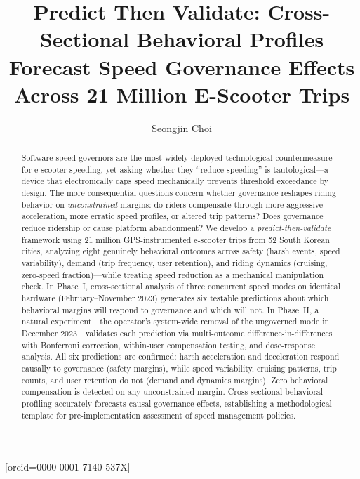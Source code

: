\documentclass[a4paper,fleqn]{cas-sc}
\begin{document}
\let\WriteBookmarks\relax
\def\floatpagepagefraction{1}
\def\textpagefraction{.001}

\title[mode=title]{Predict Then Validate: Cross-Sectional Behavioral Profiles Forecast Speed Governance Effects Across 21 Million E-Scooter Trips}

\author[1]{Seongjin Choi}[orcid=0000-0001-7140-537X]
\cormark[1]

\address[1]{Department of Civil, Environmental, and Geo- Engineering, University of Minnesota, 500 Pillsbury Dr.\ SE, Minneapolis, MN 55455, USA}


\begin{abstract}
Software speed governors are the most widely deployed technological countermeasure for e-scooter speeding, yet asking whether they ``reduce speeding'' is tautological---a device that electronically caps speed mechanically prevents threshold exceedance by design. The more consequential questions concern whether governance reshapes riding behavior on \textit{unconstrained} margins: do riders compensate through more aggressive acceleration, more erratic speed profiles, or altered trip patterns? Does governance reduce ridership or cause platform abandonment? We develop a \textit{predict-then-validate} framework using 21 million GPS-instrumented e-scooter trips from 52 South Korean cities, analyzing eight genuinely behavioral outcomes across safety (harsh events, speed variability), demand (trip frequency, user retention), and riding dynamics (cruising, zero-speed fraction)---while treating speed reduction as a mechanical manipulation check. In Phase~I, cross-sectional analysis of three concurrent speed modes on identical hardware (February--November 2023) generates six testable predictions about which behavioral margins will respond to governance and which will not. In Phase~II, a natural experiment---the operator's system-wide removal of the ungoverned mode in December 2023---validates each prediction via multi-outcome difference-in-differences with Bonferroni correction, within-user compensation testing, and dose-response analysis. All six predictions are confirmed: harsh acceleration and deceleration respond causally to governance (safety margins), while speed variability, cruising patterns, trip counts, and user retention do not (demand and dynamics margins). Zero behavioral compensation is detected on any unconstrained margin. Cross-sectional behavioral profiling accurately forecasts causal governance effects, establishing a methodological template for pre-implementation assessment of speed management policies.
\end{abstract}
\end{document}
